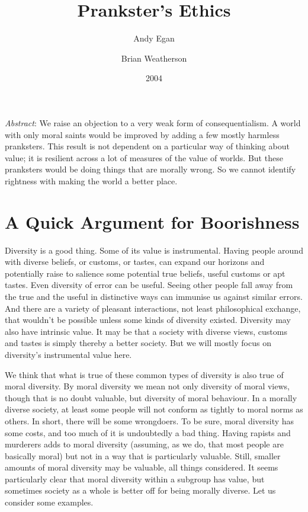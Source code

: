 \documentclass[
  11pt,
  letterpaper,
  DIV=11,
  numbers=noendperiod,
  twoside]{scrartcl}
\title{Prankster's Ethics}
\author{Andy Egan \and Brian Weatherson}
\date{2004}
\renewenvironment{abstract}
 {\vspace{-1.25cm}
 \quotation\small\noindent\emph{Abstract}:}
 {\endquotation}
\begin{document}
\maketitle
\begin{abstract}
We raise an objection to a very weak form of consequentialism. A world
with only moral saints would be improved by adding a few mostly harmless
pranksters. This result is not dependent on a particular way of thinking
about value; it is resilient across a lot of measures of the value of
worlds. But these pranksters would be doing things that are morally
wrong. So we cannot identify rightness with making the world a better
place.
\end{abstract}


\section{A Quick Argument for
Boorishness}\label{a-quick-argument-for-boorishness}

Diversity is a good thing. Some of its value is instrumental. Having
people around with diverse beliefs, or customs, or tastes, can expand
our horizons and potentially raise to salience some potential true
beliefs, useful customs or apt tastes. Even diversity of error can be
useful. Seeing other people fall away from the true and the useful in
distinctive ways can immunise us against similar errors. And there are a
variety of pleasant interactions, not least philosophical exchange, that
wouldn't be possible unless some kinds of diversity existed. Diversity
may also have intrinsic value. It may be that a society with diverse
views, customs and tastes is simply thereby a better society. But we
will mostly focus on diversity's instrumental value here.

We think that what is true of these common types of diversity is also
true of moral diversity. By moral diversity we mean not only diversity
of moral views, though that is no doubt valuable, but diversity of moral
behaviour. In a morally diverse society, at least some people will not
conform as tightly to moral norms as others. In short, there will be
some wrongdoers. To be sure, moral diversity has some costs, and too
much of it is undoubtedly a bad thing. Having rapists and murderers adds
to moral diversity (assuming, as we do, that most people are basically
moral) but not in a way that is particularly valuable. Still, smaller
amounts of moral diversity may be valuable, all things considered. It
seems particularly clear that moral diversity within a subgroup has
value, but sometimes society as a whole is better off for being morally
diverse. Let us consider some examples.
\end{document}
